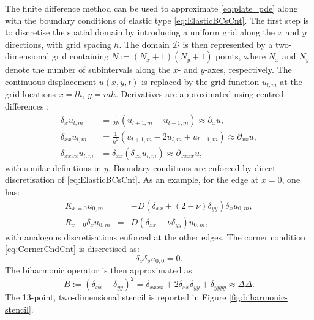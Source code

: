 The finite difference method can be used to approximate \eqref{eq:plate_pde} along with the boundary conditions of elastic type \eqref{eq:ElasticBCsCnt}. The first step is to discretise the spatial domain by introducing a uniform grid along the \(x\) and \(y\) directions, with grid spacing \(h\). The domain \(\mathcal D\) is then represented by a two-dimensional grid containing \(N := (N_x + 1)(N_y + 1)\) points, where \(N_x\) and \(N_y\) denote the number of subintervals along the \(x\)- and \(y\)-axes, respectively. The continuous displacement \(u(x,y,t)\) is replaced by the grid function \(u_{l,m}\) at the grid locations $x = lh$, $y=mh$. Derivatives are approximated using centred differences \cite{szilard_theories_2004}:
\begin{subequations}
\begin{align}
\delta_x u_{l,m} &= \tfrac{1}{2h}(u_{l+1,m}-u_{l-1,m}) \approx \partial_x u, \\
\delta_{xx} u_{l,m} &= \tfrac{1}{h^2}(u_{l+1,m}-2u_{l,m}+u_{l-1,m}) \approx \partial_{xx} u, \\
\delta_{xxxx} u_{l,m} &= \delta_{xx}(\delta_{xx}u_{l,m}) \approx \partial_{xxxx} u,
\end{align}
\end{subequations}
with similar definitions in $y$. Boundary conditions are enforced by direct discretisation of \eqref{eq:ElasticBCsCnt}. As an example, for the edge at $x=0$, one has:
\begin{subequations}\label{eq:ElasticBCsFD}
\begin{eqnarray}
K_{x=0} u_{0,m} &=& -D(\delta_{xx}+(2-\nu)\delta_{yy}) \delta_x u_{0,m}, \\
R_{x=0} \delta_x u_{0,m} &=& D(\delta_{xx}+\nu\delta_{yy}) u_{0,m},
\end{eqnarray}
\end{subequations}
with analogous discretisations enforced at the other edges. The corner condition \eqref{eq:CornerCndCnt} is discretised as:
\begin{equation}
\delta_x \delta_y u_{0,0} = 0.
\end{equation}
The biharmonic operator is then approximated as:
\begin{equation}
B := (\delta_{xx} + \delta_{yy})^{2} = \delta_{xxxx} + 2\delta_{xx}\delta_{yy} + \delta_{yyyy} \approx
\Delta\Delta.
\end{equation}
The 13-point, two-dimensional stencil is reported in Figure \ref{fig:biharmonic-stencil}. 

